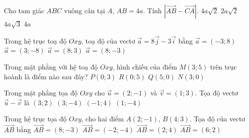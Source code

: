 \begin{ex}%
	Cho tam giác $ABC$ vuông cân tại $A$, $AB=4a$. Tính $|\overrightarrow{AB}-\overrightarrow{CA}|$.
	\choice
	{\True $ 4a\sqrt{2}$}
	{$2a\sqrt{2} $}
	{$ 4a\sqrt{3}$}
	{$ 4a$}
\end{ex}

\begin{ex}%
	Trong hệ trục toạ độ $Oxy$, toạ độ của vectơ $\overrightarrow{a}=8\overrightarrow{j}-3\overrightarrow{i}$ bằng
	\choice 
	{\True $\overrightarrow{a}=\left( -3;8 \right)$}
	{$\overrightarrow{a}=\left( 3;-8 \right)$}
	{$\overrightarrow{a}=\left( 8;3 \right)$}
	{$\overrightarrow{a}=\left( 8;-3 \right)$}
\end{ex}

\begin{ex}%
	Trong mặt phẳng với hệ toạ độ $Oxy$, hình chiếu của điểm $M(3;5)$ trên trục 
	hoành là điểm nào sau đây?
	\choice
	{$P(0;3)$}
	{$R(0;5)$}
	{$Q(5;0)$}
	{\True $N(3;0)$}
\end{ex}

\begin{ex}%
	Trong mặt phẳng tọa độ $Oxy$ cho $\overrightarrow{u}=\left(2;-1\right)$ và $\overrightarrow v=\left(1;3\right)$. Tọa độ vectơ $\overrightarrow{u}-\overrightarrow{v}$ là
	\choice
	{$\left(3;2\right)$}
	{$\left(3;-4\right)$}
	{$\left(-1;4\right)$}
	{\True $\left(1;-4\right)$}
\end{ex}

\begin{ex}%
	Trong hệ trục tọa độ $Oxy$, cho hai điểm $A\left( 2;-1 \right)$, $B\left( 4;3 \right)$. Tọa độ của vectơ $\overrightarrow{AB}$ bằng
	\choice 
	{$\overrightarrow{AB}=\left( 8;-3 \right)$}
	{$\overrightarrow{AB}=\left( -2;-4 \right)$}
	{\True $\overrightarrow{AB}=\left( 2;4 \right)$}
	{$\overrightarrow{AB}=\left( 6;2 \right)$}
\end{ex}



